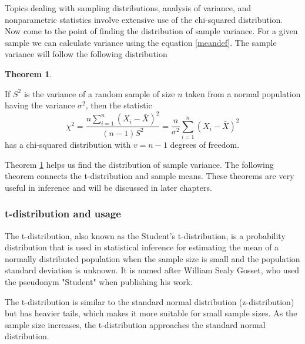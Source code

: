 \documentclass[12pt,a4paper]{article}
\theoremstyle{example}
\theoremstyle{definition}
\theoremstyle{theorem}
\newtheorem{theorem}{Theorem}
\begin{document}
Topics dealing with sampling distributions, analysis of variance, and nonparametric statistics involve extensive use of the chi-squared distribution.\\
Now come to the point of finding the distribution of sample variance. For a given sample we can calculate variance using  the equation \ref{meandef}. The sample variance will follow the following distribution \citep{walpole1993probability}


\begin{theorem}

\label{chitheorem}

If \(S^2\) is the variance of a random sample of size \(n\) taken from a normal population having the variance \(\sigma^2\), then the statistic
\[
\chi^2 = \frac{n \sum_{i=1}^{n} (X_i - \bar{X})^2}{(n - 1)S^2} = \frac{n}{\sigma^2} \sum_{i=1}^{n} (X_i - \bar{X})^2
\]
has a chi-squared distribution with \(v = n - 1\) degrees of freedom.

\label{chitheorem}

\end{theorem}
Theorem \ref{chitheorem} helps us find the distribution of sample variance. The following theorem connects the t-distribution and sample means. These theorems are very useful in inference and will be discussed in later chapters.

\subsubsection{t-distribution and usage}\label{tdistribution}

The t-distribution, also known as the Student's t-distribution, is a probability distribution that is used in statistical inference for estimating the mean of a normally distributed population when the sample size is small and the population standard deviation is unknown. It is named after William Sealy Gosset, who used the pseudonym "Student" when publishing his work.

The t-distribution is similar to the standard normal distribution (z-distribution) but has heavier tails, which makes it more suitable for small sample sizes. As the sample size increases, the t-distribution approaches the standard normal distribution.
\end{document}

